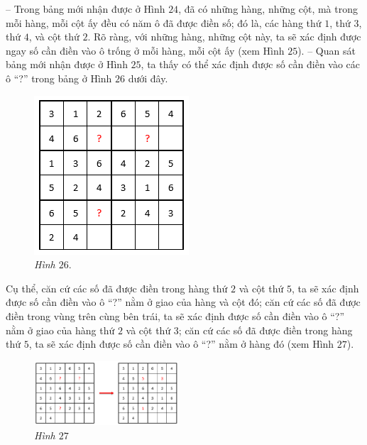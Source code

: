 	-- Trong bảng mới nhận được ở Hình $24$, đã có những hàng, những cột, mà trong mỗi hàng, mỗi cột ấy đều có năm ô đã được điền số; đó là, các hàng thứ $1$, thứ $3$, thứ $4$, và cột thứ $2$. Rõ ràng, với những hàng, những cột này, ta sẽ xác định được ngay số cần điền vào ô trống ở mỗi hàng, mỗi cột ấy (xem Hình $25$).
	\vskip 0.1cm
	-- Quan sát bảng mới nhận được ở Hình $25$, ta thấy có thể xác định được số cần điền vào các ô “?” trong bảng ở Hình $26$ dưới đây.
	\vskip 0.1cm
		\begin{figure}
		\centering
		\vspace*{-15pt}
		\captionsetup{labelformat= empty, justification=centering}
		\includegraphics[scale=0.48]{pic15}
		\vspace*{-5pt}
		\caption{\small\textit{Hình $26.$}}
		\vspace*{-15pt}
	\end{figure}
	Cụ thể, căn cứ các số đã được điền trong hàng thứ $2$ và cột thứ $5$, ta sẽ xác định được số cần điền vào ô “?” nằm ở giao của hàng và cột đó; căn cứ các số đã được điền trong vùng trên cùng  bên trái, ta sẽ xác định được số cần điền vào ô “?” nằm ở giao của hàng thứ $2$ và cột thứ $3$; căn cứ các số đã được điền trong hàng thứ $5$, ta sẽ xác định được số cần điền vào ô “?” nằm ở hàng đó (xem Hình $27$).
	\begin{figure}[H]
		\centering
		\vspace*{-10pt}
		\captionsetup{labelformat= empty, justification=centering}
		\includegraphics[width=0.48\textwidth]{pic16}
		\vspace*{-5pt}
		\caption{\small\textit{Hình $27$}}
		\vspace*{-10pt}
	\end{figure}
